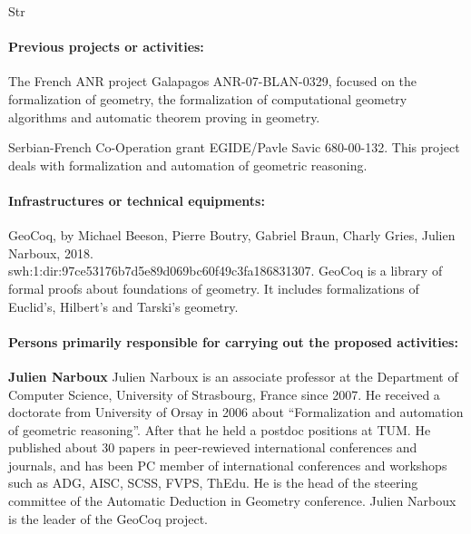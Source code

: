 \begin{sitedescription}{Str}
\paragraph*{Previous projects or activities:}

\begin{compactitem}
\item The French ANR project Galapagos ANR-07-BLAN-0329, focused on the formalization of geometry, the formalization of computational geometry algorithms and automatic theorem proving in geometry.
\item Serbian-French Co-Operation grant EGIDE/Pavle Savic 680-00-132. This project deals with formalization and automation of geometric reasoning.
\end{compactitem}

\paragraph*{Infrastructures or technical equipments:}

\begin{compactitem}
\item GeoCoq, by Michael Beeson, Pierre Boutry, Gabriel Braun, Charly Gries, Julien Narboux, 2018.\\swh:1:dir:97ce53176b7d5e89d069bc60f49c3fa186831307. GeoCoq is a library of formal proofs about foundations of geometry. It includes formalizations of Euclid's, Hilbert's and Tarski's geometry.
\end{compactitem}

\paragraph*{Persons primarily responsible for carrying out the proposed activities:}

\begin{compactitem}
\item{\bf Julien Narboux}
Julien Narboux is an associate professor at the Department of Computer Science, University of Strasbourg, France since 2007. He received a doctorate from University of Orsay in 2006 about “Formalization and automation of geometric reasoning”. After that he held a postdoc positions at TUM.
He published about 30 papers in peer-rewieved international conferences and journals, and has been PC member of international conferences and workshops such as ADG, AISC, SCSS, FVPS, ThEdu. He is the head of the steering committee of the Automatic Deduction in Geometry conference. Julien Narboux is the leader of the GeoCoq project.


\end{compactitem}
\end{sitedescription}
